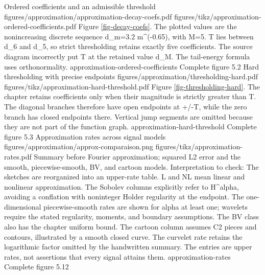 {Ordered coefficients and an admissible threshold}
{figures/approximation/approximation-decay-coefs.pdf}
{figures/tikz/approximation-ordered-coefficients.pdf}
{Figure \ref{fig-decay-coefs}.}
{The plotted values are the nonincreasing discrete sequence d\_m=3.2 m\textasciicircum{}(-0.65), with M=5. T lies between d\_6 and d\_5, so strict thresholding retains exactly five coefficients. The source diagram incorrectly put T at the retained value d\_M. The tail-energy formula uses orthonormality.}
{approximation-ordered-coefficients}
{Complete figure}
{5.2}
{Hard thresholding with precise endpoints}
{figures/approximation/thresholding-hard.pdf}
{figures/tikz/approximation-hard-threshold.pdf}
{Figure \ref{fig-thresholding-hard}.}
{The chapter retains coefficients only when their magnitude is strictly greater than T. The diagonal branches therefore have open endpoints at +/-T, while the zero branch has closed endpoints there. Vertical jump segments are omitted because they are not part of the function graph.}
{approximation-hard-threshold}
{Complete figure}
{5.3}
{Approximation rates across signal models}
{figures/approximation/approx-comparaison.png}
{figures/tikz/approximation-rates.pdf}
{Summary before Fourier approximation; squared L2 error and the smooth, piecewise-smooth, BV, and cartoon models.}
{Interpretation to check: The sketches are reorganized into an upper-rate table. L and NL mean linear and nonlinear approximation. The Sobolev columns explicitly refer to H\textasciicircum{}alpha, avoiding a conflation with noninteger Holder regularity at the endpoint. The one-dimensional piecewise-smooth rates are shown for alpha at least one; wavelets require the stated regularity, moments, and boundary assumptions. The BV class also has the chapter uniform bound. The cartoon column assumes C2 pieces and contours, illustrated by a smooth closed curve. The curvelet rate retains the logarithmic factor omitted by the handwritten summary. The entries are upper rates, not assertions that every signal attains them.}
{approximation-rates}
{Complete figure}
{5.12}

